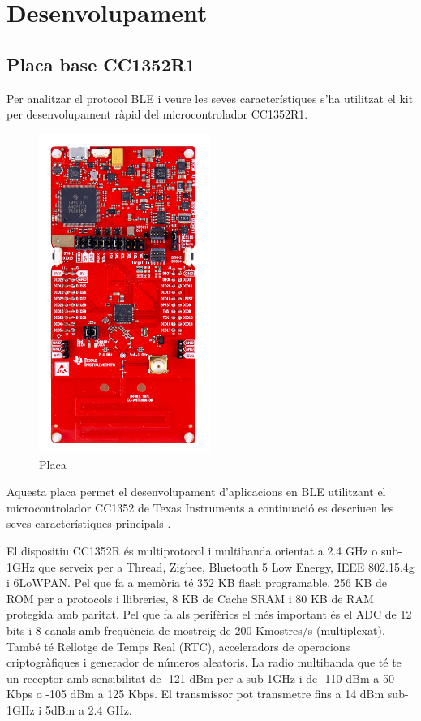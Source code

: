 \chapter{Desenvolupament}
\section{Placa base CC1352R1}
Per analitzar el protocol BLE i veure les seves característiques s'ha utilitzat el kit per desenvolupament ràpid del microcontrolador CC1352R1.
\begin{figure}[h!]
	\begin{center}
		\includegraphics[width=0.5\textwidth]{./images/launchxl-cc1352r1.jpg}
		\caption{Placa \cite{placa}}
	\end{center}
\end{figure}

Aquesta placa permet el desenvolupament d'aplicacions en BLE utilitzant el microcontrolador CC1352 de Texas Instruments a continuació es descriuen les seves característiques principals \cite{placa_datasheet}.

El dispositiu CC1352R és multiprotocol i multibanda orientat a 2.4 GHz o sub-1GHz que serveix per a Thread, Zigbee, Bluetooth 5 Low Energy, IEEE 802.15.4g i 6LoWPAN. Pel que fa a memòria té 352 KB flash programable, 256 KB de ROM per a protocols i llibreries, 8 KB de Cache SRAM i 80 KB de RAM protegida amb paritat.
Pel que fa als perifèrics el més important és el ADC de 12 bits i 8 canals amb freqüència de mostreig de 200 Kmostres/s (multiplexat). També té Rellotge de Temps Real (RTC), acceleradors de operacions criptogràfiques i generador de números aleatoris.
La radio multibanda que té te un receptor amb sensibilitat de -121 dBm per a sub-1GHz i de -110 dBm a 50 Kbps o -105 dBm a 125 Kbps. El transmissor pot transmetre fins a 14 dBm sub-1GHz i 5dBm a 2.4 GHz.


